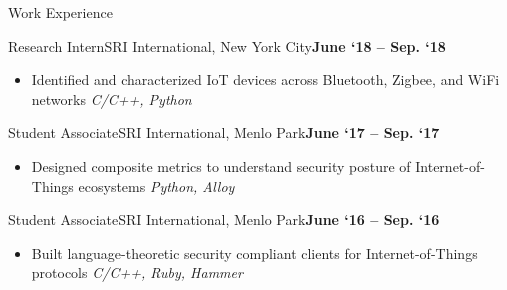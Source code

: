\documentclass[]{mcdowellcv}
\begin{document}
\begin{cvsection}{Work Experience}
\begin{cvsubsection}{Research Intern}{\hspace{0.5cm}SRI International, New York City}{\textbf{June `18 -- Sep. `18}}			
			\begin{itemize}
				\item Identified and characterized IoT devices across Bluetooth, Zigbee, and WiFi networks \mbox{}\hfill\textit{\color{dartmouthgreen} C/C++, Python}
			\end{itemize}
		\end{cvsubsection}
\begin{cvsubsection}{Student Associate}{SRI International, Menlo Park}{\textbf{June `17 -- Sep. `17}}			
			\begin{itemize}
				\item Designed composite metrics to understand security posture of Internet-of-Things ecosystems \mbox{}\hfill\textit{\color{dartmouthgreen} Python, Alloy}
			\end{itemize}
		\end{cvsubsection}
        \begin{cvsubsection}{Student Associate}{SRI International, Menlo Park}{\textbf{June `16 -- Sep. `16}}			
			\begin{itemize}
				\item Built language-theoretic security compliant clients for Internet-of-Things protocols \mbox{}\hfill\textit{\color{dartmouthgreen} C/C++, Ruby, Hammer}
				\end{itemize}
		\end{cvsubsection}
	\end{cvsection}
\end{document}
